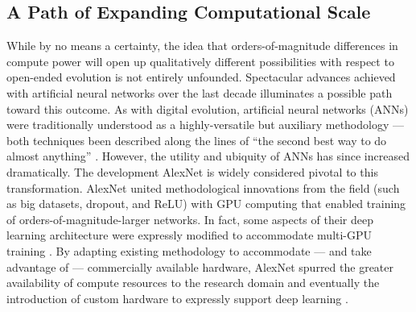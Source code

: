 \subsection{A Path of Expanding Computational Scale}


While by no means a certainty, the idea that orders-of-magnitude differences in compute power will open up qualitatively different possibilities with respect to open-ended evolution is not entirely unfounded.
Spectacular advances achieved with artificial neural networks over the last decade illuminates a possible path toward this outcome.
As with digital evolution, artificial neural networks (ANNs) were traditionally understood as a highly-versatile but auxiliary methodology --- both techniques been described along the lines of ``the second best way to do almost anything'' \citep{miaoulis2008intelligent, eiben2015introduction}.
However, the utility and ubiquity of ANNs has since increased dramatically.
The development AlexNet is widely considered pivotal to this transformation.
AlexNet united methodological innovations from the field (such as big datasets, dropout, and ReLU) with GPU computing that enabled training of orders-of-magnitude-larger networks.
In fact, some aspects of their deep learning architecture were expressly modified to accommodate multi-GPU training \citep{krizhevsky2012imagenet}.
By adapting existing methodology to accommodate --- and take advantage of --- commercially available hardware, AlexNet spurred the greater availability of compute resources to the research domain and eventually the introduction of custom hardware to expressly support deep learning \citep{jouppi2017datacenter}.

